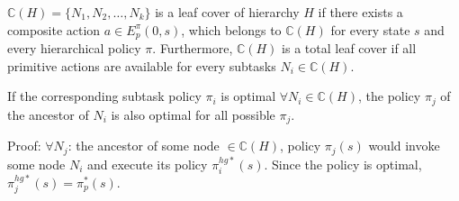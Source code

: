 \begin{definition}
    $\mathbb{C}(H) = \{N_1, N_2, \dots, N_k\}$ is a leaf cover of hierarchy $H$ if 
    there exists a composite action $a \in E_p^{\pi}(0, s)$, which belongs to $\mathbb{C}(H)$ for every
    state $s$ and every hierarchical policy $\pi$.
    Furthermore, $\mathbb{C}(H)$ is a total leaf cover if all primitive actions are available for every 
    subtasks $N_i \in \mathbb{C}(H)$.
\end{definition}





\begin{theorem}
    If the corresponding subtask policy $\pi_i$ is optimal $\forall N_i \in \mathbb{C}(H)$,
    the policy $\pi_j$ of the ancestor of $N_i$ is also optimal for all possible $\pi_j$.
\end{theorem}
Proof: $\forall N_j$: the ancestor of some node $\in \mathbb{C}(H)$, policy $\pi_j(s)$ would invoke some 
node $N_i$ and execute its policy $\pi_i^{hg*}(s)$. Since the policy is optimal, $\pi_j^{hg*}(s)=\pi_p^*(s)$.

